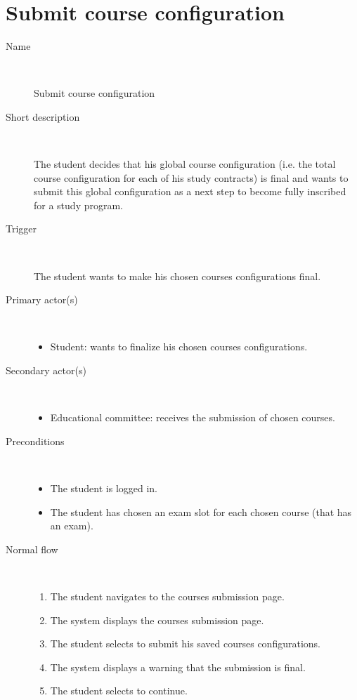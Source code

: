 \section{Submit course configuration}

\begin{description}
	\item[Name] \
		\par Submit course configuration
	\item[Short description] \ 
			\par The student decides that his global course configuration (i.e. the total
			course configuration for each of his study contracts) is final and wants to
			submit this global configuration as a next step to become fully inscribed for
			a study program. 
	\item[Trigger] \ 
			\par The student wants to make his chosen courses configurations final.
	\item[Primary actor(s)] \ 
		\begin{itemize}
		  \item Student: wants to finalize his chosen courses configurations.
		\end{itemize}
	\item[Secondary actor(s)] \ 
		\begin{itemize}
		  \item Educational committee: receives the submission of chosen courses.
		\end{itemize} 
	\item[Preconditions] \ 
	\begin{itemize}
		\item The student is logged in.
		\item The student has chosen an exam slot for each chosen course (that has an
		exam).
	\end{itemize}
	\item[Normal flow] \ 
	\begin{enumerate}
	  	\item The student navigates to the courses submission page.
	  	\item The system displays the courses submission page.
	  	\item The student selects to submit his saved courses configurations.
	  	\item The system displays a warning that the submission is final.
	  	\item The student selects to continue.

\end{enumerate}
\end{description}
